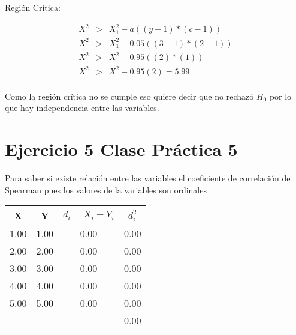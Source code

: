 \documentclass{article}
\begin{document}
		\begin{flushleft}
			Regi\'on Cr\'itica:
		\end{flushleft}
		\begin{equation*}    
		\begin{array}{lcl}
		X^2 & > & X_{1}^{2} - a \left(\left(y-1\right)*\left(c-1\right)\right)\\
		X^2 & > & X_{1}^{2} - 0.05 \left(\left(3-1\right)*\left(2-1\right)\right)\\
		X^2 & > & X^{2} - 0.95 \left(\left(2\right)*\left(1\right)\right)\\
		X^2 & > & X^{2} - 0.95 \left(2\right) = 5.99\\
		\end{array}
		\end{equation*}
		
		\begin{flushleft}
			Como la regi\'on cr\'itica no se cumple eso quiere decir que no rechaz\'o $H_{0}$ por lo que hay independencia entre las variables.
		\end{flushleft}
	
	
	
	\section*{Ejercicio 5 Clase Pr\'actica 5}
	
	\begin{flushleft}
		Para saber si existe relaci\'on entre las variables el coeficiente de correlaci\'on de Spearman pues los valores de la variables son ordinales
	\end{flushleft}
	
	\begin{table}[ht]
		\centering
		\begin{tabular}{|cccc|}
			\hline
			\rowcolor[gray]{0.9} X & Y & $d_{i}= X_i -Y_i$ & $d_{i}^{2}$ \\ 
			\hline
			1.00 & 1.00 & 0.00 & 0.00 \\ 
			2.00 & 2.00 & 0.00 & 0.00 \\ 
			3.00 & 3.00 & 0.00 & 0.00 \\ 
			4.00 & 4.00 & 0.00 & 0.00 \\ 
			5.00 & 5.00 & 0.00 & 0.00 \\ 
			\hline
	        &&& \cellcolor[gray]{0.9} 0.00  \\
			\hline
		\end{tabular}
	\end{table}
	
\end{document}
